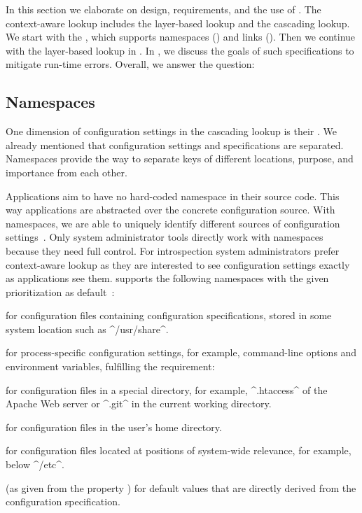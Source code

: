 In this section we elaborate on design, requirements, and the use of .
The context-aware lookup includes the layer-based lookup and the cascading lookup.
We start with the , which supports namespaces () and links ().
Then we continue with the layer-based lookup in .
In , we discuss the goals of such specifications to mitigate run-time errors.
Overall, we answer the question:
\rqBackendContextLookup*

\subsection{Namespaces}
\label{sec:backend-namespaces}


One dimension of configuration settings in the cascading lookup is their .
We already mentioned that configuration settings and specifications are separated.
Name\-spaces provide the way to separate keys of different locations, purpose, and importance from each other.

Applications aim to have no hard-coded namespace in their source code.
This way applications are abstracted over the concrete configuration source.
With namespaces, we are able to uniquely identify different sources of configuration settings~\cite{raab2015kps}.
Only system administrator tools directly work with namespaces because they need full control.
For introspection system administrators prefer context-aware lookup as they are interested to see configuration settings exactly as applications see them.
\elektra{} supports the following namespaces with the given prioritization as default~\cite{raab2015kps}:


\label{sec:namespace}
\begin{description}[font=\normalfont\scshape]
\item[spec] for configuration files containing configuration specifications, stored in some system location such as ^/usr/share^.
\item[proc] for process-specific configuration settings, for example, command-line options and environment variables, fulfilling the requirement: \reqEnvironment*
\item[dir] for configuration files in a special directory, for example, ^.htaccess^ of the Apache Web server or ^.git^ in the current working directory.
\item[user] for configuration files in the user's home directory.
\item[system] for configuration files located at positions of system-wide relevance, for example, below ^/etc^.
\item[(default)] (as given from the property ) for default values that are directly derived from the configuration specification.
\end{description}

